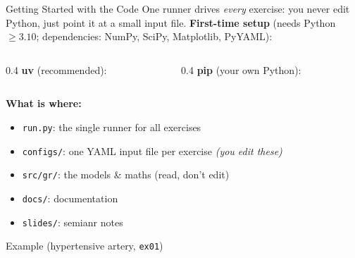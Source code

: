 \begin{frame}[t]{Getting Started with the Code}
  \small
  One runner drives \emph{every} exercise: you never edit Python, just point
  it at a small input file. \textbf{First-time setup} (needs Python $\ge3.10$;
  dependencies: NumPy, SciPy, Matplotlib, PyYAML):
  \par\smallskip
  \vspace{0.2em}
  \begin{columns}[T]
    \begin{column}{0.4\textwidth}
      \textbf{\color{YaleBlue}uv} (recommended):
    \end{column}
    \begin{column}{0.4\textwidth}
      \textbf{\color{YaleBlue}pip} (your own Python):
    \end{column}
  \end{columns}
  \vspace{0.5em}
  \textbf{What is where:}
  \begin{itemize}\setlength\itemsep{1pt}
    \item \texttt{run.py}: the single runner for all exercises
    \item \texttt{configs/}: one YAML input file per exercise \emph{(you edit these)}
    \item \texttt{src/gr/}: the models \& maths (read, don't edit)
    \item \texttt{docs/}: documentation
    \item \texttt{slides/}: semianr notes
  \end{itemize}
\end{frame}

\begin{frame}[t]{}
  \begin{setupbox}{Example (hypertensive artery, \texttt{ex01})}
  \end{setupbox}
\end{frame}

